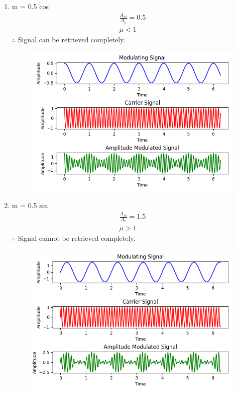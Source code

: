 \documentclass[journal,12pt,twocolumn]{IEEEtran}
\theoremstyle{remark}
\begin{document}
\begin{enumerate}

    \item m = 0.5 cos 
\begin{align}
    \frac{A_m}{A_c}= 0.5 \\
    \mu <1
\end{align}
$\therefore$ Signal can be retrieved completely.
\renewcommand{\thefigure}{\theenumi}
 \renewcommand{\thetable}{\theenumi}
\begin{figure}[h]
  
  \includegraphics[width=\columnwidth]{figs/Figure_1.png}
  
\end{figure}
\item m = 0.5 sin 
\begin{align}
    \frac{A_m}{A_c}= 1.5\\
    \mu >1
\end{align}
$\therefore$ Signal cannot be retrieved completely.
\renewcommand{\thefigure}{\theenumi}
 \renewcommand{\thetable}{\theenumi}
\begin{figure}[h]
  
  \includegraphics[width=\columnwidth]{figs/Figure_2.png}
  

\end{figure}
\end{enumerate}
\end{document}

